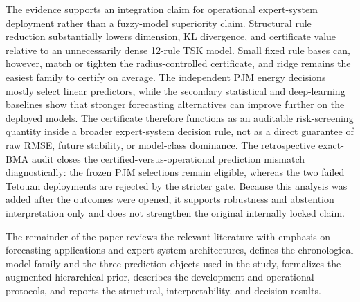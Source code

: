 The evidence supports an integration claim for operational expert-system deployment
rather than a fuzzy-model superiority claim. Structural rule reduction substantially
lowers dimension, KL divergence, and certificate value relative to an unnecessarily
dense 12-rule TSK model. Small fixed rule bases can, however, match or tighten the
radius-controlled certificate, and ridge remains the easiest family to certify on
average. The independent PJM energy decisions mostly select linear predictors,
while the secondary statistical and deep-learning baselines show that stronger
forecasting alternatives can improve further on the deployed models. The
certificate therefore functions as an auditable risk-screening quantity inside a
broader expert-system decision rule, not as a direct guarantee of raw RMSE, future
stability, or model-class dominance.
The retrospective exact-BMA audit closes the certified-versus-operational
prediction mismatch diagnostically: the frozen PJM selections remain eligible,
whereas the two failed Tetouan deployments are rejected by the stricter gate.
Because this analysis was added after the outcomes were opened, it supports
robustness and abstention interpretation only and does not strengthen the original
internally locked claim.

The remainder of the paper reviews the relevant literature with emphasis on
forecasting applications and expert-system architectures, defines the chronological
model family and the three prediction objects used in the study, formalizes the
augmented hierarchical prior, describes the development and operational protocols,
and reports the structural, interpretability, and decision results.